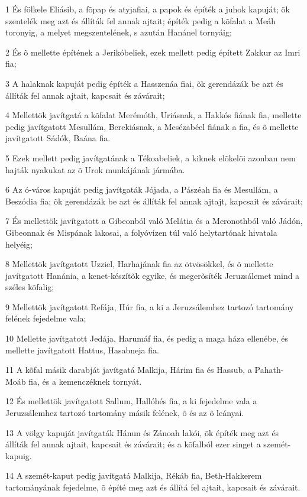 \par 1 És fölkele Eliásib, a fõpap és atyjafiai, a papok és építék a juhok kapuját; õk szentelék meg azt és állíták fel annak ajtait; építék pedig a kõfalat a Meáh toronyig, a melyet megszentelének, s azután Hanánel tornyáig;
\par 2 És õ mellette építének a Jerikóbeliek, ezek mellett pedig épített Zakkur az Imri fia;
\par 3 A halaknak kapuját pedig építék a Hasszenáa fiai, õk gerendázák be azt és állíták fel annak ajtait, kapcsait és závárait;
\par 4 Mellettök javítgatá a kõfalat Merémóth, Uriásnak, a Hakkós fiának fia, mellette pedig javítgatott Mesullám, Berekiásnak, a Mesézabéel fiának a fia, és õ mellette javítgatott Sádók, Baána fia.
\par 5 Ezek mellett pedig javítgatának a Tékoabeliek, a kiknek elõkelõi azonban nem hajták nyakukat az õ Urok munkájának jármába.
\par 6 Az ó-város kapuját pedig javítgaták Jójada, a Pászéah fia és Mesullám, a Beszódia fia; õk gerendázák be azt és állíták fel annak ajtajt, kapcsait és závárait;
\par 7 És mellettök javítgatott a Gibeonból való Melátia és a Meronothból való Jádón, Gibeonnak és Mispának lakosai, a folyóvizen túl való helytartónak hivatala helyéig;
\par 8 Mellettök javítgatott Uzziel, Harhajának fia az ötvösökkel, és õ mellette javítgatott Hanánia, a kenet-készítõk egyike, és megerõsíték Jeruzsálemet mind a széles kõfalig;
\par 9 Mellettök javítgatott Refája, Húr fia, a ki a Jeruzsálemhez tartozó tartomány felének fejedelme vala;
\par 10 Mellette javítgatott Jedája, Harumáf fia, és pedig a maga háza ellenébe, és mellette javítgatott Hattus, Hasabneja fia.
\par 11 A kõfal másik darabját javítgatá Malkija, Hárim fia és Hassub, a Pahath-Moáb fia, és a kemenczéknek tornyát.
\par 12 És mellettök javítgatott Sallum, Hallóhés fia, a ki fejedelme vala a Jeruzsálemhez tartozó tartomány másik felének, õ és az õ leányai.
\par 13 A völgy kapuját javítgaták Hánun és Zánoah lakói, õk építék meg azt és állíták fel annak ajtait, kapcsait és závárait; és a kõfalból ezer singet a szemét-kapuig.
\par 14 A szemét-kaput pedig javítgatá Malkija, Rékáb fia, Beth-Hakkerem tartományának fejedelme, õ építé meg azt és állítá fel ajtait, kapcsait és závárait.
